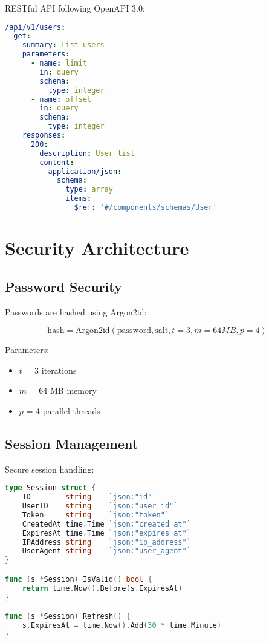 \documentclass[11pt,a4paper]{article}
\begin{document}
RESTful API following OpenAPI 3.0:

\begin{lstlisting}[language=yaml]
/api/v1/users:
  get:
    summary: List users
    parameters:
      - name: limit
        in: query
        schema:
          type: integer
      - name: offset
        in: query
        schema:
          type: integer
    responses:
      200:
        description: User list
        content:
          application/json:
            schema:
              type: array
              items:
                $ref: '#/components/schemas/User'
\end{lstlisting}

\section{Security Architecture}

\subsection{Password Security}

Passwords are hashed using Argon2id:

\begin{equation}
    \text{hash} = \text{Argon2id}(\text{password}, \text{salt}, t=3, m=64MB, p=4)
\end{equation}

Parameters:
\begin{itemize}
    \item $t$ = 3 iterations
    \item $m$ = 64 MB memory
    \item $p$ = 4 parallel threads
\end{itemize}

\subsection{Session Management}

Secure session handling:

\begin{lstlisting}[language=Go]
type Session struct {
    ID        string    `json:"id"`
    UserID    string    `json:"user_id"`
    Token     string    `json:"token"`
    CreatedAt time.Time `json:"created_at"`
    ExpiresAt time.Time `json:"expires_at"`
    IPAddress string    `json:"ip_address"`
    UserAgent string    `json:"user_agent"`
}

func (s *Session) IsValid() bool {
    return time.Now().Before(s.ExpiresAt)
}

func (s *Session) Refresh() {
    s.ExpiresAt = time.Now().Add(30 * time.Minute)
}
\end{lstlisting}
\end{document}
